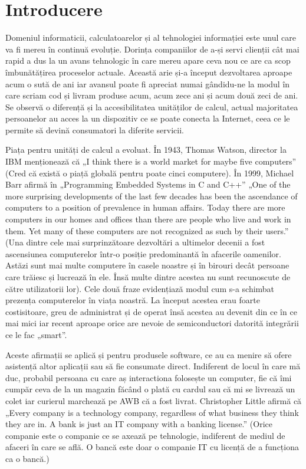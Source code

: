 \chapter{Introducere}
Domeniul informaticii, calculatoarelor și al tehnologiei informației este unul care va fi mereu
în continuă evoluție. Dorința companiilor de a-și servi clienții cât mai rapid a dus la un avans
tehnologic în care mereu apare ceva nou ce are ca scop îmbunătățirea proceselor actuale. Această arie și-a
început dezvoltarea aproape acum o sută de ani iar avansul poate fi apreciat numai gândidu-ne la modul în
care scriam cod și livram produse acum, acum zece ani și acum două zeci de ani. Se observă o diferență
și la accesibilitatea unităților de calcul, actual majoritatea persoanelor au acces la un dispozitiv ce
se poate conecta la Internet, ceea ce le permite să devină consumatori la diferite servicii.

Piața pentru unități de calcul a evoluat. În 1943, Thomas Watson, director la IBM menționează că 
„I think there is a world market for maybe five computers” (Cred că există o piață globală 
pentru poate cinci computere). În 1999, Michael Barr afirmă în „Programming Embedded Systems in C and C++”
„One of the more surprising developments of the last few decades has been the
ascendance of computers to a position of prevalence in human affairs. Today there are
more computers in our homes and offices than there are people who live and work in
them. Yet many of these computers are not recognized as such by their users.” (Una dintre cele mai 
surprinzătoare dezvoltări a ultimelor decenii a fost ascensiunea computerelor într-o posiție predominantă 
în afacerile oamenilor. Astăzi sunt mai multe computere în casele noastre și în birouri decât persoane care trăiesc
și lucrează în ele. Însă multe dintre acestea nu sunt recunoscute de către utilizatorii lor). Cele două fraze evidențiază
modul cum s-a schimbat prezența computerelor în viața noastră. La început acestea erau foarte costisitoare, 
greu de administrat și de operat însă acestea au devenit din ce în ce mai mici iar recent aproape orice are 
nevoie de semiconductori datorită integrării ce le fac „smart”. 

Aceste afirmații se aplică și pentru produsele software, ce au ca menire să ofere asistență altor aplicații
sau să fie consumate direct. Indiferent de locul în care mă duc, probabil persoana cu care aș interactiona
folosește un computer, fie că îmi cumpăr ceva de la un magazin făcând o plată cu cardul sau că mi se livrează un colet
iar curierul marchează pe AWB că a fost livrat. Christopher Little afirmă că „Every company is a technology company, regardless of 
what business they think they are in. A bank is just an IT company with a banking license.” (Orice companie
este o companie ce se axează pe tehnologie, indiferent de mediul de afaceri în care se află. O bancă este doar o companie
IT cu licență de a funcționa ca o bancă.)

